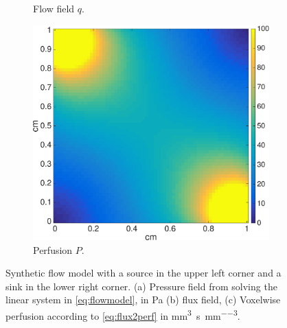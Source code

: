 \documentclass[paper=a4, fontsize=12pt,parskip=half,headings=small]{scrartcl}
\newcommand{\siP}{\cubic\milli\meter\per\second\per\cubic\milli\meter}
\begin{document}
\begin{figure}[H]
\begin{subfigure}[b]{0.3\textwidth}
                \caption{Flow field $q$.}
            \end{subfigure}	           	                     
            \begin{subfigure}[b]{0.3\textwidth}
				\includegraphics[width=\textwidth]{figs/perfusion.eps}
                \caption{Perfusion $P$.}
            \end{subfigure}	                
    	\caption{Synthetic flow model with a source in the upper left corner and a sink in the lower right corner. (a) Pressure field from solving the linear system in \eqref{eq:flowmodel}, in \si{\pascal} (b) flux field, (c) Voxelwise perfusion according to \eqref{eq:flux2perf} in \si{\siP}.}
	        \label{fig:flowpressureperfusion}
	\end{figure}
	
\end{document}
